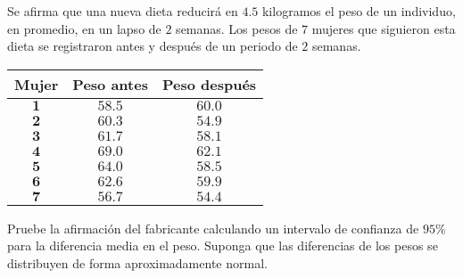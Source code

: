 \begin{enunciado}
 Se afirma que una nueva dieta reducir\'a en $4.5$ kilogramos el peso de un individuo, en promedio, en un lapso de $2$ semanas. Los pesos de $7$ mujeres que siguieron esta dieta se registraron antes y despu\'es de un periodo de $2$ semanas.
 \begin{center}
  \begin{tabular}{ccc}
   \textbf{Mujer} & \textbf{Peso antes} & \textbf{Peso despu\'es} \\
   \hline 
   $\mathbf{1}$ & $58.5$ & $60.0$ \\
   $\mathbf{2}$ & $60.3$ & $54.9$ \\
   $\mathbf{3}$ & $61.7$ & $58.1$ \\
   $\mathbf{4}$ & $69.0$ & $62.1$ \\
   $\mathbf{5}$ & $64.0$ & $58.5$ \\
   $\mathbf{6}$ & $62.6$ & $59.9$ \\
   $\mathbf{7}$ & $56.7$ & $54.4$
  \end{tabular}
 \end{center}
 Pruebe la afirmaci\'on del fabricante calculando un intervalo de confianza de $95\%$ para la diferencia media en el peso. Suponga que las diferencias de los pesos se distribuyen de forma aproximadamente normal.
\end{enunciado}

